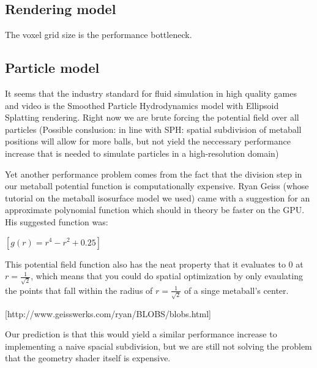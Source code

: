 \documentclass{article}
\begin{document}
        \subsection{Rendering model}
        The voxel grid size is the performance bottleneck.

        \subsection{Particle model}
    	It seems that the industry standard for fluid simulation in high quality games and video is the Smoothed Particle Hydrodynamics model with Ellipsoid Splatting rendering.
        Right now we are brute forcing the potential field over all particles
        (Possible conslusion: in line with SPH: spatial subdivision of metaball positions will allow for more balls, but not yield the neccessary performance increase that is needed to simulate particles in a high-resolution domain)

        Yet another performance problem comes from the fact that the division step in our metaball potential function is computationally expensive.
        Ryan Geiss (whose tutorial on the metaball isosurface model we used) came with a suggestion for an approximate polynomial function which should in theory be faster on the GPU. His suggested function was:

        $[g(r) = r^4 - r^2 + 0.25]$

        This potential field function also has the neat property that it evaluates to 0 at $r=\frac{1}{\sqrt{2}}$, which means that you could do spatial optimization by only evaulating the points that fall within the radius of $r=\frac{1}{\sqrt{2}}$ of a singe metaball's center.

        [http://www.geisswerks.com/ryan/BLOBS/blobs.html]

        Our prediction is that this would yield a similar performance increase to implementing a naive spacial subdivision, but we are still not solving the problem that the geometry shader itself is expensive.
\end{document}
